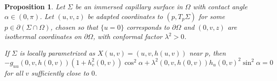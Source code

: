 \documentclass[11pt,reqno]{amsart}
\newtheorem{proposition}[theorem]{Proposition}
\begin{document}
\begin{proposition}\label{prop:condição de bordo}
    Let $\Sigma$ be an immersed capillary surface in $\Omega$ with contact angle $\alpha\in(0,\pi)$. Let $(u,v,z)$ be adapted coordinates  to $(p,T_p\Sigma)$ for some $p\in \partial(\Sigma\cap  \Omega)$, chosen so that $\{u=0\}$ corresponds to $\partial \Omega$ and $(0,v,z)$ are isothermal coordinates on $\partial \Omega$, with conformal factor $\lambda^2>0$. 
    
    If $\Sigma$ is locally parametrized as $X(u,v)=(u,v,h(u,v))$ near $p$, then
    \begin{equation}\label{eq:prop2.1}
     -g_{uu}(0,v,h(0,v))(1+h_v^2(0,v))\cos^2\alpha+\lambda^2(0,v,h(0,v)) h_u(0,v)^2\sin^2\alpha=0
    \end{equation}
    for all $v$ sufficiently close to $0$.
\end{proposition}
\end{document}
